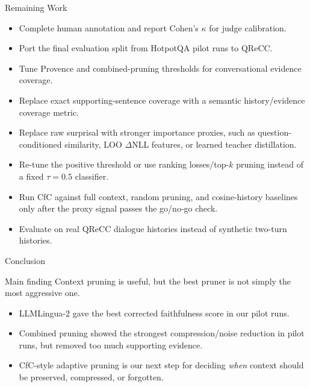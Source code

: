 \documentclass[aspectratio=169,11pt]{beamer}
\begin{document}
\begin{frame}{Remaining Work}
  \begin{itemize}
    \item Complete human annotation and report Cohen's $\kappa$ for judge calibration.
    \item Port the final evaluation split from HotpotQA pilot runs to QReCC.
    \item Tune Provence and combined-pruning thresholds for conversational evidence coverage.
    \item Replace exact supporting-sentence coverage with a semantic history/evidence coverage metric.
    \item Replace raw surprisal with stronger importance proxies, such as question-conditioned similarity, LOO $\Delta$NLL features, or learned teacher distillation.
    \item Re-tune the positive threshold or use ranking losses/top-$k$ pruning instead of a fixed $\tau=0.5$ classifier.
    \item Run CfC against full context, random pruning, and cosine-history baselines only after the proxy signal passes the go/no-go check.
    \item Evaluate on real QReCC dialogue histories instead of synthetic two-turn histories.
  \end{itemize}
\end{frame}

\begin{frame}{Conclusion}
  \begin{block}{Main finding}
    Context pruning is useful, but the best pruner is not simply the most aggressive one.
  \end{block}

  \begin{itemize}
    \item LLMLingua-2 gave the best corrected faithfulness score in our pilot runs.
    \item Combined pruning showed the strongest compression/noise reduction in pilot runs, but removed too much supporting evidence.
    \item CfC-style adaptive pruning is our next step for deciding \emph{when} context should be preserved, compressed, or forgotten.
  \end{itemize}
\end{frame}
\end{document}
